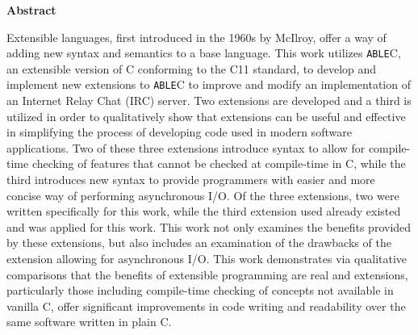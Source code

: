 \documentclass[main.tex]{subfiles}
\begin{document}
\begin{center}\textbf{Abstract}\end{center}
Extensible languages, first introduced in the 1960s by McIlroy, offer a way of adding new syntax and semantics to a
base language. This work utilizes \verb|ABLE|C, an extensible version of C conforming to the C11 standard, to develop 
and implement new extensions to \verb|ABLE|C to improve
and modify an implementation of an Internet Relay Chat (IRC) server. Two extensions are developed and a third is utilized in order to
qualitatively show that extensions can be useful and effective in simplifying the process of developing code used in modern
software applications. Two of these three extensions introduce syntax to allow for compile-time checking of features
that cannot be checked at compile-time in C, while the third introduces new syntax to provide programmers
with easier and more concise way of performing asynchronous I/O. Of the three extensions, two were written 
specifically for this work, while the third extension used already existed and was applied for this work. This
work not only examines the benefits provided by these extensions, but also includes an examination of the drawbacks
of the extension allowing for asynchronous I/O. This work demonstrates via qualitative comparisons that the
benefits of extensible programming are real and extensions, particularly those including compile-time checking of
concepts not available in vanilla C, offer significant improvements in code writing and readability over the same
software written in plain C.
\end{document}

